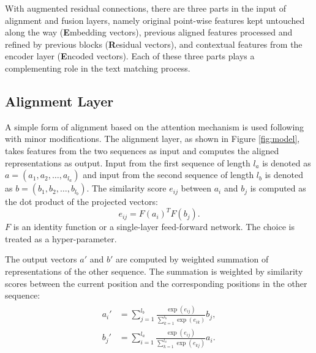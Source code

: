 \documentclass[11pt,a4paper]{article}
\begin{document}
With augmented residual connections, there are three parts in the input of alignment and fusion layers, namely original point-wise features kept untouched along the way (\textbf{E}mbedding vectors), previous aligned features processed and refined by previous blocks (\textbf{R}esidual vectors), and contextual features from the encoder layer (\textbf{E}ncoded vectors). Each of these three parts plays a complementing role in the text matching process. 

\subsection{Alignment Layer}

A simple form of alignment based on the attention mechanism is used following \citeauthor{parikh2016decomposable}  with minor modifications. The alignment layer, as shown in Figure \ref{fig:model}, takes features from the two sequences as input and computes the aligned representations as output. Input from the first sequence of length $l_a$ is denoted as $a=(a_1, a_2, \dots, a_{l_a})$ and input from the second sequence of length $l_b$ is denoted as $b=(b_1, b_2, \dots, b_{l_b})$.
The similarity score $e_{ij}$ between $a_i$ and $b_j$ is computed as the dot product of the projected vectors:
\begin{equation}
e_{ij}=F(a_i)^T F(b_j). \label{eq:align}
\end{equation}
$F$ is an identity function or a single-layer feed-forward network. The choice is treated as a hyper-parameter.

The output vectors $a'$ and $b'$ are computed by weighted summation of representations of the other sequence. The summation is weighted by similarity scores between the current position and the corresponding positions in the other sequence:
\begin{align}
\begin{split}
  a_i' &= \sum_{j=1}^{l_b}\frac{\exp(e_{ij})}{\sum_{k=1}^{l_b}\exp(e_{ik})}b_j, \\
  b_j' &= \sum_{i=1}^{l_a}\frac{\exp(e_{ij})}{\sum_{k=1}^{l_a}\exp(e_{kj})}a_i.
\end{split} \label{eq:aligned}
\end{align}
\end{document}
